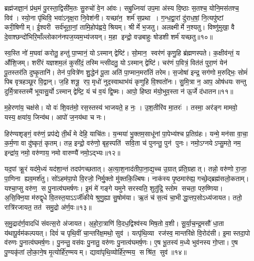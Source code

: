 ब्रह्म॑जज्ञा॒नं प्र॑थ॒मं पु॒रस्ता॒द्विसी॑म॒तः सु॒रुचो॑ वे॒न आ॑वः। सबु॒ध्निया॑ उप॒मा अ॑स्य वि॒ष्ठाः स॒तश्च॒ योनि॒मस॑तश्च॒ विव॑। स्यो॒ना पृ॑थिवि॒ भवा॑ऽनृक्ष॒रा नि॒वेश॑नी। यच्छा॑न॒ शर्म॑ स॒प्रथा। ग॒न्ध॒द्वा॒रां दु॑राध॒\ar{}षां॒ नि॒त्यपु॑ष्टां करी॒षिणीम्। ई॒श्वरी सर्व॑भूता॒नां॒ तामि॒होप॑ह्वये॒ श्रियम्। श्रीर्मे भ॒जतु। अलक्ष्मीर्मे न॒श्यतु। विष्णु॑मुखा॒ वै दे॒वाश्छन्दो॑भिरि॒माँल्लोकान॑नपज॒य्यम॒भ्य॑जयन्। म॒हा इन्द्रो॒ वज्रबाहुः षोडशी शर्म॑ यच्छतु॥१०॥

 स्व॒स्ति नो॑ म॒घवा॑ करोतु॒ हन्तु॑ पा॒प्मानं॒ योऽस्मान् द्वेष्टि॑। सो॒मान॒ स्वर॑णं कृणु॒हि ब्र॑ह्मणस्पते। क॒क्षीव॑न्तं॒ य औ॑शि॒जम्। शरी॑रं यज्ञशम॒लं कुसी॑दं॒ तस्मिन्त्सीदतु॒ योऽस्मान् द्वेष्टि॑। चर॑णं प॒वित्रं॒ वित॑तं पुरा॒णं येन॑ पू॒तस्तर॑ति दुष्कृ॒तानि॑। तेन॑ प॒वित्रे॑ण शु॒द्धेन॑ पू॒ता अति॑ पा॒प्मान॒मरा॑तिं तरेम। स॒जोषा॑ इन्द्र॒ सग॑णो म॒रुद्भिः॒ सोमं॑ पिब वृत्रहञ्छूर वि॒द्वान्। ज॒हि शत्रू॒ रप॒ मृधो॑ नुद॒स्वाथाभ॑यं कृणुहि वि॒श्वतो॑नः। सु॒मि॒त्रा न॒ आप॒ ओष॑धयः सन्तु दुर्मि॒त्रास्तस्मै॑ भूयासु॒र्योऽस्मान् द्वेष्टि॒ यं च॑ व॒यं द्वि॒ष्मः। आपो॒ हिष्ठा म॑यो॒भुव॒स्ता न॑ ऊ॒र्जे द॑धातन॥११॥
 
 म॒हेरणा॑य॒ चक्ष॑से। यो वः॑ शि॒वत॑मो॒ रस॒स्तस्य॑ भाजयते॒ ह नः॒ । उ॒श॒तीरि॑व मा॒तरः॑ । तस्मा॒ अर॑ङ्ग मामवो॒ यस्य॒ क्षया॑य॒ जिन्व॑थ। आपो॑ ज॒नय॑था च नः।

 
हिर॑ण्यशृङ्गं॒ वरु॑णं॒ प्रप॑द्ये ती॒र्थं मे देहि॒ याचि॑तः। य॒न्मया॑ भु॒क्तम॒साधू॑नां पा॒पेभ्य॑श्च प्र॒तिग्र॑हः। यन्मे॒ मन॑सा वा॒चा॒ क॒र्म॒णा वा दु॑ष्कृतं॒ कृतम्। तन्न॒ इन्द्रो॒ वरु॑णो॒ बृह॒स्पति॑ सवि॒ता च॑ पुनन्तु॒ पुन॑ पुनः। नमो॒ऽग्नयेऽप्सु॒मते॒ नम॒ इन्द्रा॑य॒ नमो॒ वरु॑णाय॒ नमो वारुण्यै॑ नमो॒ऽद्भ्यः॥१२॥

 यद॒पां क्रू॒रं यद॑मे॒ध्यं यद॑शा॒न्तं तदप॑गच्छतात्। अ॒त्या॒श॒नाद॑ती\-पा॒ना॒द्य॒च्च उ॒ग्रात् प्र॑ति॒ग्रहात्। तन्नो॒ वरु॑णो रा॒जा॒ पा॒णिना ह्यव॒मर्\mbox{}श॑तु। सो॑ऽहम॑पा॒पो वि॒रजो॒ निर्मु॒क्तो मु॑क्तकि॒ल्बिषः। नाक॑स्य पृ॒ष्ठमारु॑ह्य॒ गच्छे॒द्ब्रह्म॑सलो॒कताम्। यश्चा॒प्सु वरु॑ण॒ स पु॒नात्व॑घमर्\mbox{}षणः। इ॒मं मे॑ गङ्गे यमुने सरस्वति॒ शुतु॑द्रि॒ स्तोम सचता॒ परु॒ष्णिया। अ॒सि॒क्नि॒या म॑रुद्\mbox{}वृधे वि॒तस्त॒याऽऽर्जी॑कीये श्रुणु॒ह्या सु॒षोम॑या। ऋ॒तं च॑ स॒त्यं चा॒भीद्धा॒त्तप॒सोऽध्य॑जायत। ततो॒ रात्रि॑रजायत॒ तत॑ समु॒द्रो अ॑र्ण॒वः॥१३॥
 
 स॒मु॒द्राद॑र्ण॒वादधि॑ संवत्स॒रो अ॑जायत। अ॒हो॒रा॒त्राणि॑ वि॒दध॒द्विश्व॑स्य मिष॒तो व॒शी। सू॒र्या॒च॒न्द्र॒मसौ॑ धा॒ता य॑थापू॒र्वम॑कल्पयत्। दिवं॑ च पृथि॒वीं चा॒न्तरि॑क्ष॒मथो॒ सुव॑। यत्पृ॑थि॒व्या रज॑स्व॒ मान्तरि॑क्षे वि॒रोद॑सी। इ॒मास्तदा॒पो व॑रुणः पु॒नात्व॑घमर्\mbox{}ष॒णः। पु॒नन्तु॒ वस॑वः पु॒नातु॒ वरु॑णः पु॒नात्व॑घमर्\mbox{}ष॒णः। ए॒ष भू॒तस्य॑ म॒ध्ये भुव॑नस्य गो॒प्ता। ए॒ष पु॒ण्यकृ॑तां लो॒का॒ने॒ष मृ॒त्योर्\mbox{}हि॑र॒ण्मयम्। द्यावा॑पृथि॒व्योर्\mbox{}हि॑र॒ण्मय॒ सश्रि॑त॒ सुव॑॥१४॥

